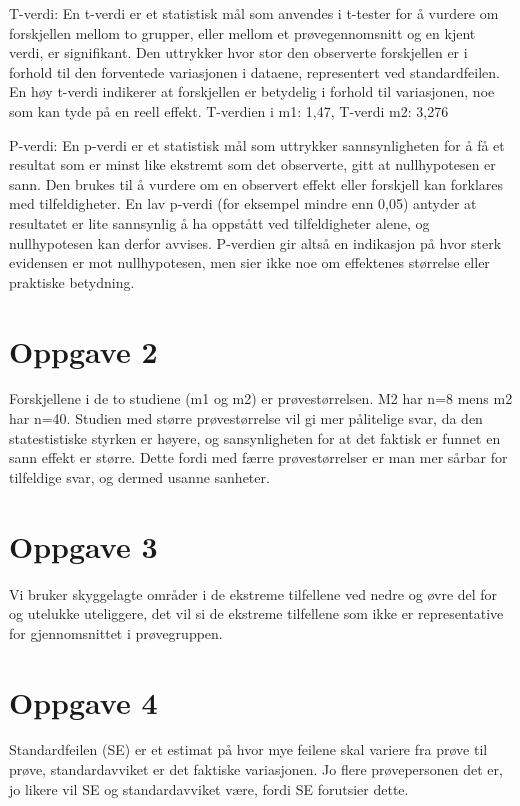\documentclass[
  letterpaper,
  DIV=11,
  numbers=noendperiod]{scrreprt}
\begin{document}
T-verdi: En t-verdi er et statistisk mål som anvendes i t-tester for å
vurdere om forskjellen mellom to grupper, eller mellom et
prøvegennomsnitt og en kjent verdi, er signifikant. Den uttrykker hvor
stor den observerte forskjellen er i forhold til den forventede
variasjonen i dataene, representert ved standardfeilen. En høy t-verdi
indikerer at forskjellen er betydelig i forhold til variasjonen, noe som
kan tyde på en reell effekt. T-verdien i m1: 1,47, T-verdi m2: 3,276

P-verdi: En p-verdi er et statistisk mål som uttrykker sannsynligheten
for å få et resultat som er minst like ekstremt som det observerte, gitt
at nullhypotesen er sann. Den brukes til å vurdere om en observert
effekt eller forskjell kan forklares med tilfeldigheter. En lav p-verdi
(for eksempel mindre enn 0,05) antyder at resultatet er lite sannsynlig
å ha oppstått ved tilfeldigheter alene, og nullhypotesen kan derfor
avvises. P-verdien gir altså en indikasjon på hvor sterk evidensen er
mot nullhypotesen, men sier ikke noe om effektenes størrelse eller
praktiske betydning.

\section{Oppgave 2}\label{oppgave-2}

Forskjellene i de to studiene (m1 og m2) er prøvestørrelsen. M2 har n=8
mens m2 har n=40. Studien med større prøvestørrelse vil gi mer
pålitelige svar, da den statestistiske styrken er høyere, og
sansynligheten for at det faktisk er funnet en sann effekt er større.
Dette fordi med færre prøvestørrelser er man mer sårbar for tilfeldige
svar, og dermed usanne sanheter.

\section{Oppgave 3}\label{oppgave-3}

Vi bruker skyggelagte områder i de ekstreme tilfellene ved nedre og øvre
del for og utelukke uteliggere, det vil si de ekstreme tilfellene som
ikke er representative for gjennomsnittet i prøvegruppen.

\section{Oppgave 4}\label{oppgave-4}

Standardfeilen (SE) er et estimat på hvor mye feilene skal variere fra
prøve til prøve, standardavviket er det faktiske variasjonen. Jo flere
prøvepersonen det er, jo likere vil SE og standardavviket være, fordi SE
forutsier dette.
\end{document}
